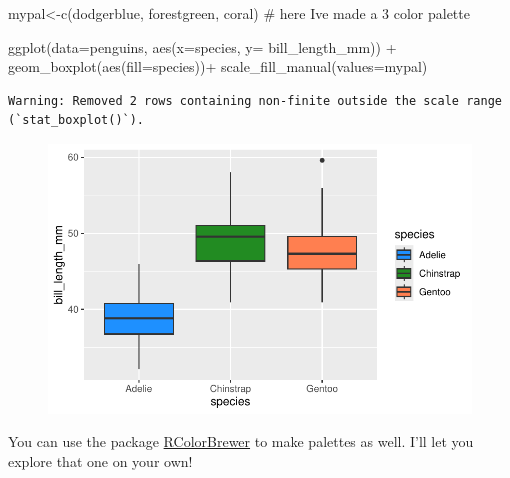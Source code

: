 \documentclass[
  letterpaper,
  DIV=11,
  numbers=noendperiod]{scrartcl}
\newenvironment{Shaded}{\begin{snugshade}}{\end{snugshade}}
\newcommand{\AttributeTok}[1]{\textcolor[rgb]{0.40,0.45,0.13}{#1}}
\newcommand{\CommentTok}[1]{\textcolor[rgb]{0.37,0.37,0.37}{#1}}
\newcommand{\FunctionTok}[1]{\textcolor[rgb]{0.28,0.35,0.67}{#1}}
\newcommand{\NormalTok}[1]{\textcolor[rgb]{0.00,0.23,0.31}{#1}}
\newcommand{\OtherTok}[1]{\textcolor[rgb]{0.00,0.23,0.31}{#1}}
\newcommand{\SpecialCharTok}[1]{\textcolor[rgb]{0.37,0.37,0.37}{#1}}
\newcommand{\StringTok}[1]{\textcolor[rgb]{0.13,0.47,0.30}{#1}}
\begin{document}
\begin{Shaded}
\begin{Highlighting}[]
\NormalTok{mypal}\OtherTok{\textless{}{-}}\FunctionTok{c}\NormalTok{(}\StringTok{\textquotesingle{}dodgerblue\textquotesingle{}}\NormalTok{, }\StringTok{\textquotesingle{}forestgreen\textquotesingle{}}\NormalTok{, }\StringTok{\textquotesingle{}coral\textquotesingle{}}\NormalTok{) }\CommentTok{\# here I\textquotesingle{}ve made a 3 color palette}

\FunctionTok{ggplot}\NormalTok{(}\AttributeTok{data=}\NormalTok{penguins, }\FunctionTok{aes}\NormalTok{(}\AttributeTok{x=}\NormalTok{species, }\AttributeTok{y=}\NormalTok{ bill\_length\_mm)) }\SpecialCharTok{+}
  \FunctionTok{geom\_boxplot}\NormalTok{(}\FunctionTok{aes}\NormalTok{(}\AttributeTok{fill=}\NormalTok{species))}\SpecialCharTok{+}
  \FunctionTok{scale\_fill\_manual}\NormalTok{(}\AttributeTok{values=}\NormalTok{mypal)}
\end{Highlighting}
\end{Shaded}

\begin{verbatim}
Warning: Removed 2 rows containing non-finite outside the scale range
(`stat_boxplot()`).
\end{verbatim}

\begin{figure}[H]

{\centering \includegraphics{Lab_2_files/figure-pdf/unnamed-chunk-26-1.pdf}

}

\end{figure}

You can use the package
\href{https://renenyffenegger.ch/notes/development/languages/R/packages/RColorBrewer/index}{RColorBrewer}
to make palettes as well. I'll let you explore that one on your own!
\end{document}
